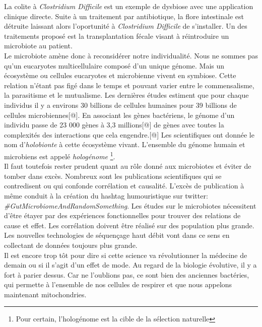 \documentclass[12pt,a4paper]{article}
\begin{document}
La colite à \textit{Clostridium Difficile} est un exemple de dysbiose avec une application clinique directe. Suite à un traitement par antibiotique, la flore intestinale est détruite laissant alors l'oportunité à \textit{Clostridium Difficile} de s'installer. Un des traitements proposé est la transplantation fécale visant à réintroduire un microbiote au patient. \\
Le microbiote amène donc à reconsidérer notre individualité. Nous ne sommes pas qu’un eucaryotes multicellulaire composé d’un unique génome. Mais un écosystème ou cellules eucaryotes et microbienne vivent en symbiose. Cette relation n'étant pas figé dans le temps et pouvant varier entre le commensalisme, la parasitisme et le mutualisme. Les dernières études estiment que pour chaque individus il y a environs 30 billions de cellules humaines pour 39 billions de cellules microbiennes[@]. En associant les gènes bactériens, le génome d’un individu passe de 23 000 gènes à 3,3 millions[@] de gènes avec toutes la complexités des interactions que cela engendre.[@] Les scientifiques ont donnée le nom d’\textit{holobionte} à cette écosystème vivant. L'ensemble du génome humain et microbiens est appelé \textit{hologénome} \footnote{Pour certain, l'hologénome est la cible de la sélection naturelle}. \\
Il faut toutefois rester prudent quant au rôle donné aux microbiotes et éviter de tomber dans excès. Nombreux sont les publications scientifiques qui se contredisent ou qui confonde corrélation et causalité. L'excès de publication à même conduit à la création du hashtag humouristique sur twitter: \textit{\#GutMicrobiomeAndRandomSomething}. 
Les études sur le microbiotes nécessitent d'être étayer par des expériences fonctionnelles pour trouver des relations de cause et effet. Les corrélation doivent être réalisé sur des population plus grande. Les nouvelles technologies de séquençage haut débit vont dans ce sens en collectant de données toujours plus grande. \\
Il est encore trop tôt pour dire si cette science va révolutionner la médecine de demain ou si il s'agit d'un effet de mode.
Au regard de la biologie évolutive, il y a fort à parier dessus. Car ne l'oublions pas, ce sont bien des anciennes bactéries, qui permette à l'ensemble de nos cellules de respirer et que nous appelons maintenant mitochondries.
\end{document}
